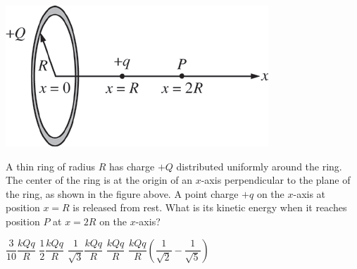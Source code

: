 \begin{center}
\includegraphics[scale=0.5]{images/img-007-019.png}
\end{center}

\begin{questions}\setcounter{question}{23}\question
A thin ring of radius $R$ has charge $+Q$ distributed uniformly around the ring. The center of the ring is at the origin of an $x$-axis perpendicular to the plane of the ring, as shown in the figure above. A point charge $+q$ on the $x$-axis at position $x=R$ is released from rest. What is its kinetic energy when it reaches position $P$ at $x=2 R$ on the $x$-axis?

\begin{oneparchoices}
\choice $\dfrac{3}{10} \dfrac{k Q q}{R}$
\choice $\dfrac{1}{2} \dfrac{k Q q}{R}$
\choice $\dfrac{1}{\sqrt{3}} \dfrac{k Q q}{R}$
\choice $\dfrac{k Q q}{R}$
\choice $\dfrac{k Q q}{R}\left(\dfrac{1}{\sqrt{2}}-\dfrac{1}{\sqrt{5}}\right)$
\end{oneparchoices}\end{questions}

